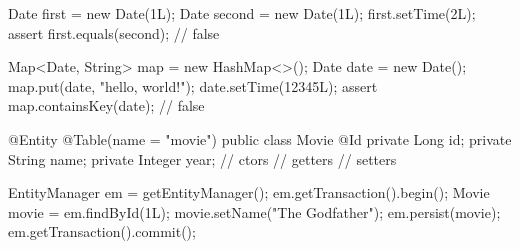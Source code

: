 \documentclass{article}
\begin{document}
\begin{pptWide}{2}
{\small\begin{ffcode}
Date first = new Date(1L);
Date second = new Date(1L);
first.setTime(2L);
assert first.equals(second); // false
\end{ffcode}
}
\par\columnbreak\par
{\small\begin{ffcode}
Map<Date, String> map = new HashMap<>();
Date date = new Date();
map.put(date, "hello, world!");
date.setTime(12345L);
assert map.containsKey(date); // false
\end{ffcode}
}
\end{pptWide}
\par
\plush{}



\begin{pptWide}{2}
{\small\begin{ffcode}
@Entity
@Table(name = "movie")
public class Movie {
  @Id
  private Long id;
  private String name;
  private Integer year;
  // ctors
  // getters
  // setters
}
\end{ffcode}
}
\par\columnbreak\par
{\small\begin{ffcode}
EntityManager em = getEntityManager();
em.getTransaction().begin();
Movie movie = em.findById(1L);
movie.setName("The Godfather");
em.persist(movie);
em.getTransaction().commit();
\end{ffcode}
}
\end{pptWide}
\par
\plush{}
\end{document}
